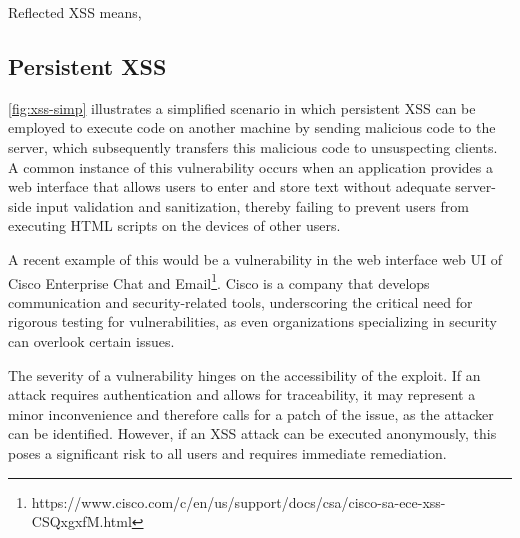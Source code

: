 Reflected XSS means, 


\subsection{Persistent XSS}

\autoref{fig:xss-simp} illustrates a simplified scenario in which persistent XSS can be employed to execute code on
another machine by sending malicious code to the server, which subsequently transfers this malicious code to unsuspecting clients.
A common instance of this vulnerability occurs when an application provides a web interface that allows users
to enter and store text without adequate server-side input validation and sanitization,
thereby failing to prevent users from executing HTML scripts on the devices of other users.

A recent example of this would be a vulnerability in the web interface web UI of Cisco Enterprise Chat and 
Email\footnote{https://www.cisco.com/c/en/us/support/docs/csa/cisco-sa-ece-xss-CSQxgxfM.html}. 
Cisco is a company that develops communication and security-related tools, 
underscoring the critical need for rigorous testing for vulnerabilities,
as even organizations specializing in security can overlook certain issues.

The severity of a vulnerability hinges on the accessibility of the exploit. 
If an attack requires authentication and allows for traceability,
it may represent a minor inconvenience and therefore calls for a patch of the issue,
as the attacker can be identified. However, if an XSS attack can be executed anonymously,
this poses a significant risk to all users and requires immediate remediation.



